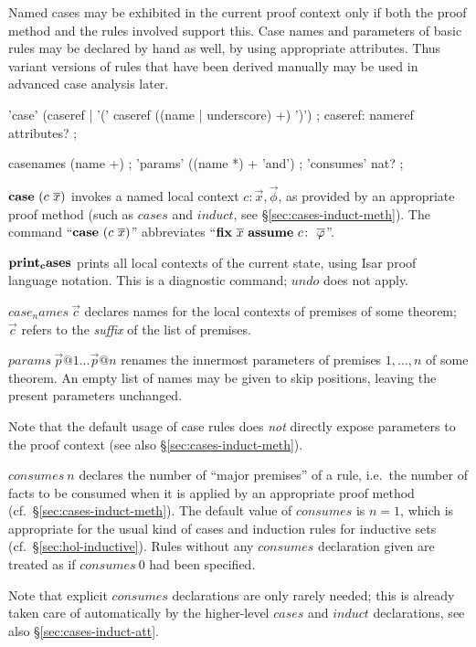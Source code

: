 Named cases may be exhibited in the current proof context only if both the
proof method and the rules involved support this.  Case names and parameters
of basic rules may be declared by hand as well, by using appropriate
attributes.  Thus variant versions of rules that have been derived manually
may be used in advanced case analysis later.


\begin{rail}
  'case' (caseref | '(' caseref ((name | underscore) +) ')')
  ;
  caseref: nameref attributes?
  ;

  casenames (name +)
  ;
  'params' ((name *) + 'and')
  ;
  'consumes' nat?
  ;
\end{rail}

\begin{descr}

\item [${\mathord{\mathbf{case}}}~(c~\overline{x})$] invokes a named local context $c\colon \vec x,
  \vec \phi$, as provided by an appropriate proof method (such as $cases$ and
  $induct$, see \S\ref{sec:cases-induct-meth}).  The command ``${\mathord{\mathbf{case}}}~(c~\overline{x})$'' abbreviates ``$\FIX{\vec x}~\ASSUME{c}{\vec\phi}$''.

\item [${\mathord{\mathbf{print_cases}}}$] prints all local contexts of the current
  state, using Isar proof language notation.  This is a diagnostic command;
  $undo$ does not apply.

\item [$case_names~\vec c$] declares names for the local contexts of premises
  of some theorem; $\vec c$ refers to the \emph{suffix} of the list of
  premises.

\item [$params~\vec p@1 \dots \vec p@n$] renames the innermost parameters of
  premises $1, \dots, n$ of some theorem.  An empty list of names may be given
  to skip positions, leaving the present parameters unchanged.

  Note that the default usage of case rules does \emph{not} directly expose
  parameters to the proof context (see also \S\ref{sec:cases-induct-meth}).

\item [$consumes~n$] declares the number of ``major premises'' of a rule,
  i.e.\ the number of facts to be consumed when it is applied by an
  appropriate proof method (cf.\ \S\ref{sec:cases-induct-meth}).  The default
  value of $consumes$ is $n = 1$, which is appropriate for the usual kind of
  cases and induction rules for inductive sets (cf.\
  \S\ref{sec:hol-inductive}).  Rules without any $consumes$ declaration given
  are treated as if $consumes~0$ had been specified.

  Note that explicit $consumes$ declarations are only rarely needed; this is
  already taken care of automatically by the higher-level $cases$ and $induct$
  declarations, see also \S\ref{sec:cases-induct-att}.

\end{descr}


